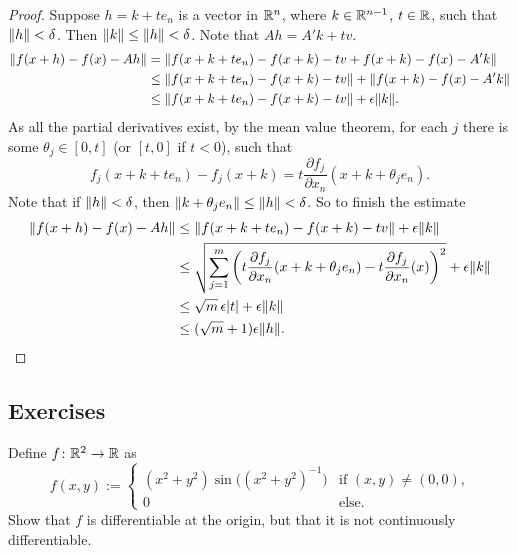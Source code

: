 \begin{proof}
Suppose $h = k + t e_n$ is a vector in ${\mathbb{R}}^n$, where $k \in {\mathbb{R}}^{n-1}$, $t
\in {\mathbb{R}}$, such that
$\lVert {h} \rVert < \delta$.  Then $\lVert {k} \rVert \leq \lVert {h} \rVert < \delta$.
Note that $Ah = A' k + tv$.
\begin{equation*}
\begin{split}
\lVert {f(x+h) - f(x) - Ah} \rVert
& = \lVert {f(x+k + t e_n) - f(x+k) - tv + f(x+k) - f(x) - A' k} \rVert
\\
& \leq \lVert {f(x+k + t e_n) - f(x+k) -tv} \rVert + \lVert {f(x+k) - f(x) -
A' k} \rVert
\\
& \leq \lVert {f(x+k + t e_n) - f(x+k) -tv} \rVert + \epsilon \lVert {k} \rVert .
\end{split}
\end{equation*}
As all the partial derivatives exist, by the mean value theorem,
for each $j$ there is some $\theta_j \in [0,t]$ (or $[t,0]$ if $t < 0$), such that
\begin{equation*}
f_j(x+k + t e_n) - f_j(x+k) =
t \frac{\partial f_j}{\partial x_n}(x+k+\theta_j e_n).
\end{equation*}
Note that if $\lVert {h} \rVert < \delta$, then $\lVert {k+\theta_j e_n} \rVert \leq \lVert {h} \rVert
< \delta$.
So to finish the estimate
\begin{equation*}
\begin{split}
\lVert {f(x+h) - f(x) - Ah} \rVert
& \leq \lVert {f(x+k + t e_n) - f(x+k) -tv} \rVert + \epsilon \lVert {k} \rVert
\\
& \leq \sqrt{\sum_{j=1}^m {\left(t\frac{\partial f_j}{\partial
x_n}(x+k+\theta_j e_n) -
t \frac{\partial f_j}{\partial x_n}(x)\right)}^2} + \epsilon \lVert {k} \rVert
\\
& \leq \sqrt{m}\, \epsilon \lvert {t} \rvert + \epsilon \lVert {k} \rVert
\\
& \leq (\sqrt{m}+1)\epsilon \lVert {h} \rVert . \qedhere
\end{split}
\end{equation*}
\end{proof}

\subsection{Exercises}

\begin{exercise}
Define $f \colon {\mathbb{R}}^2 \to {\mathbb{R}}$ as
\begin{equation*}
f(x,y) :=
\begin{cases}
(x^2+y^2)\sin\bigl({(x^2+y^2)}^{-1}\bigr) & \text{if $(x,y)
\not= (0,0)$,} \\
0 & \text{else.}
\end{cases}
\end{equation*}
Show that $f$ is differentiable at the origin, but that it is not 
continuously differentiable.
\end{exercise}

